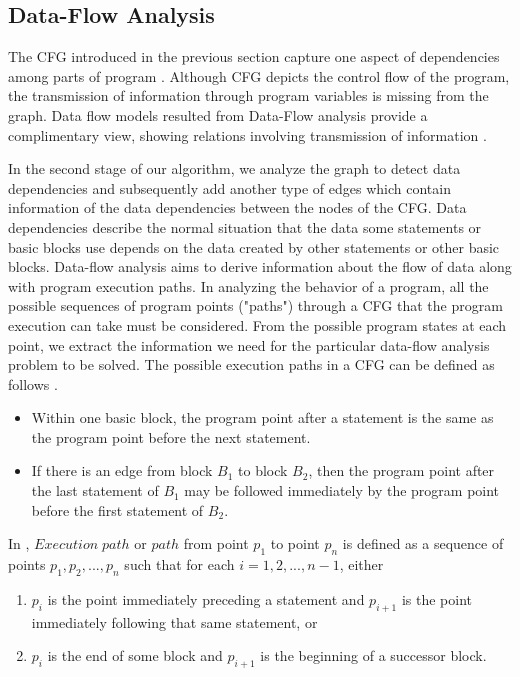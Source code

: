 \subsection{Data-Flow Analysis}
\label{sec:DFAnalysis}
The CFG introduced in the previous section capture one aspect of dependencies among parts of program \cite{young2008software}. Although CFG depicts the control flow of the program, the transmission of information through program variables is missing from the graph. Data flow models resulted from Data-Flow analysis provide a complimentary view, showing relations involving transmission of information \cite{young2008software}. 

In the second stage of our algorithm, we analyze the graph to detect data dependencies and subsequently add another type of edges which contain information of the data dependencies between the nodes of the CFG. Data dependencies describe the normal situation that the data some statements or basic blocks use depends on the data created by other statements or other basic blocks. Data-flow analysis aims to derive information about the flow of data along with program execution paths. In analyzing the behavior of a program, all the possible sequences of program points ("paths") through a CFG that the program execution can take must be considered. From the possible program states at each point, we extract the information we need for the particular data-flow analysis problem to be solved. The possible execution paths in a CFG can be defined as follows \cite{lam2006compilers}.
\begin{itemize}
\item Within one basic block, the program point after a statement is the same as the program point before the next statement. 
\item If there is an edge from block $B_{1}$ to block $B_{2}$, then the program point after the last statement of $B_{1}$ may be followed immediately by the program point before the first statement of $B_{2}$. 
\end{itemize}
In \cite{lam2006compilers}, $Execution\;path$ or $path$ from point $p_{1}$ to point $p_{n}$ is defined as a sequence of points $p_{1}, p_{2}, ..., p_{n}$ such that for each $i = 1, 2, ..., n-1$, either 
\begin{enumerate}
\item $p_{i}$ is the point immediately preceding a statement and $p_{i+1}$ is the point immediately following that same statement, or 
\item $p_{i}$ is the end of some block and $p_{i+1}$ is the beginning of a successor block. 
\end{enumerate}

